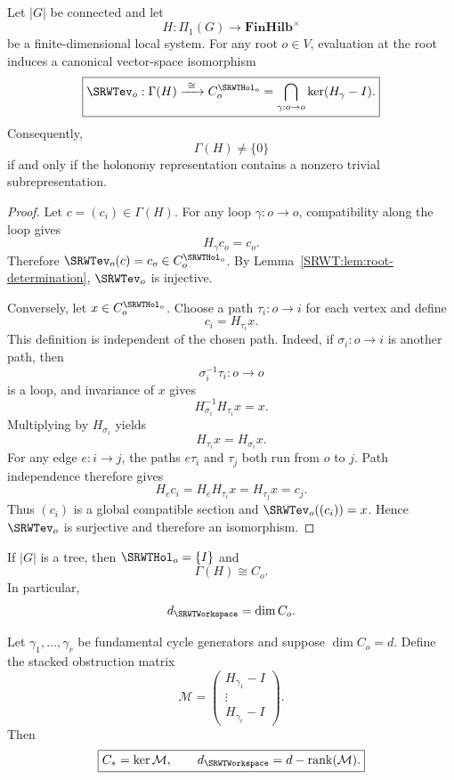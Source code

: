 \begin{SRWTtheorem}\label{SRWT:thm:limit-holonomy}
Let \(|G|\) be connected and let
\[
H:\Pi_1(G)\to\mathbf{FinHilb}^{\times}
\]
be a finite-dimensional local system. For any root \(o\in V\), evaluation at
the root induces a canonical vector-space isomorphism
\[
\boxed{
\SRWTev_o:\Gamma(H)
\xrightarrow{\ \cong\ }
C_o^{\SRWTHol_o}
=
\bigcap_{\gamma:o\to o}\ker(H_\gamma-I).
}
\]
Consequently,
\[
\Gamma(H)\neq\{0\}
\]
if and only if the holonomy representation contains a nonzero trivial
subrepresentation.
\end{SRWTtheorem}

\begin{proof}
Let \(c=(c_i)\in\Gamma(H)\). For any loop \(\gamma:o\to o\), compatibility
along the loop gives
\[
H_\gamma c_o=c_o.
\]
Therefore \(\SRWTev_o(c)=c_o\in C_o^{\SRWTHol_o}\). By
Lemma~\ref{SRWT:lem:root-determination}, \(\SRWTev_o\) is injective.

Conversely, let \(x\in C_o^{\SRWTHol_o}\). Choose a path
\(\tau_i:o\to i\) for each vertex and define
\[
c_i=H_{\tau_i}x.
\]
This definition is independent of the chosen path. Indeed, if
\(\sigma_i:o\to i\) is another path, then
\[
\sigma_i^{-1}\tau_i:o\to o
\]
is a loop, and invariance of \(x\) gives
\[
H_{\sigma_i}^{-1}H_{\tau_i}x=x.
\]
Multiplying by \(H_{\sigma_i}\) yields
\[
H_{\tau_i}x=H_{\sigma_i}x.
\]
For any edge \(e:i\to j\), the paths \(e\tau_i\) and \(\tau_j\) both run
from \(o\) to \(j\). Path independence therefore gives
\[
H_ec_i
=H_eH_{\tau_i}x
=H_{\tau_j}x
=c_j.
\]
Thus \((c_i)\) is a global compatible section and \(\SRWTev_o((c_i))=x\).
Hence \(\SRWTev_o\) is surjective and therefore an isomorphism.
\end{proof}

\begin{SRWTcorollary}\label{SRWT:cor:tree-core}
If \(|G|\) is a tree, then \(\SRWTHol_o=\{I\}\) and
\[
\Gamma(H)\cong C_o.
\]
In particular,
\[
d_{\SRWTWorkspace}=\dim C_o.
\]
\end{SRWTcorollary}

\begin{SRWTcorollary}\label{SRWT:cor:finite-matrix-test}
Let \(\gamma_1,\ldots,\gamma_r\) be fundamental cycle generators and suppose
\(\dim C_o=d\). Define the stacked obstruction matrix
\[
\mathcal M
=
\begin{pmatrix}
H_{\gamma_1}-I\\
\vdots\\
H_{\gamma_r}-I
\end{pmatrix}.
\]
Then
\[
\boxed{
C_*=\ker\mathcal M,
\qquad
d_{\SRWTWorkspace}=d-\operatorname{rank}(\mathcal M).
}
\]
\end{SRWTcorollary}

